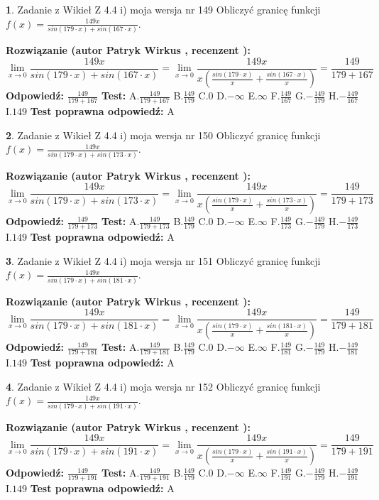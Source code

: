 \documentclass[12pt, a4paper]{article}
\theoremstyle{definition} %
\newtheorem{zad}{}
\newcommand{\zadStart}[1]{\begin{zad}#1\newline}
\newcommand{\zadStop}{\end{zad}}
\newcommand{\rozwStart}[2]{\noindent \textbf{Rozwiązanie (autor #1 , recenzent #2): }\newline}
\newcommand{\rozwStop}{\newline}
\newcommand{\odpStart}{\noindent \textbf{Odpowiedź:}\newline}
\newcommand{\odpStop}{\newline}
\newcommand{\testStart}{\noindent \textbf{Test:}\newline}
\newcommand{\testStop}{\newline}
\newcommand{\kluczStart}{\noindent \textbf{Test poprawna odpowiedź:}\newline}
\newcommand{\kluczStop}{\newline}
\begin{document}
\zadStart{Zadanie z Wikieł Z 4.4 i) moja wersja nr 149}
Obliczyć granicę funkcji $f(x)=\frac{149x}{sin(179\cdot x) +sin(167\cdot x)}$.
\zadStop
\rozwStart{Patryk Wirkus}{}
$$\lim\limits_{x\to 0}\frac{149x}{sin(179\cdot x) +sin(167\cdot x)}=\lim\limits_{x\to 0}\frac{149x}{x(\frac{sin(179\cdot x)}{x}+\frac{sin(167\cdot x)}{x})}=\frac{149}{179+167}$$
\rozwStop
\odpStart
$\frac{149}{179+167}$
\odpStop
\testStart
A.$\frac{149}{179+167}$
B.$\frac{149}{179}$
C.$0$
D.$-\infty$
E.$\infty$
F.$\frac{149}{167}$
G.$-\frac{149}{179}$
H.$-\frac{149}{167}$
I.$149$
\testStop
\kluczStart
A
\kluczStop



\zadStart{Zadanie z Wikieł Z 4.4 i) moja wersja nr 150}
Obliczyć granicę funkcji $f(x)=\frac{149x}{sin(179\cdot x) +sin(173\cdot x)}$.
\zadStop
\rozwStart{Patryk Wirkus}{}
$$\lim\limits_{x\to 0}\frac{149x}{sin(179\cdot x) +sin(173\cdot x)}=\lim\limits_{x\to 0}\frac{149x}{x(\frac{sin(179\cdot x)}{x}+\frac{sin(173\cdot x)}{x})}=\frac{149}{179+173}$$
\rozwStop
\odpStart
$\frac{149}{179+173}$
\odpStop
\testStart
A.$\frac{149}{179+173}$
B.$\frac{149}{179}$
C.$0$
D.$-\infty$
E.$\infty$
F.$\frac{149}{173}$
G.$-\frac{149}{179}$
H.$-\frac{149}{173}$
I.$149$
\testStop
\kluczStart
A
\kluczStop



\zadStart{Zadanie z Wikieł Z 4.4 i) moja wersja nr 151}
Obliczyć granicę funkcji $f(x)=\frac{149x}{sin(179\cdot x) +sin(181\cdot x)}$.
\zadStop
\rozwStart{Patryk Wirkus}{}
$$\lim\limits_{x\to 0}\frac{149x}{sin(179\cdot x) +sin(181\cdot x)}=\lim\limits_{x\to 0}\frac{149x}{x(\frac{sin(179\cdot x)}{x}+\frac{sin(181\cdot x)}{x})}=\frac{149}{179+181}$$
\rozwStop
\odpStart
$\frac{149}{179+181}$
\odpStop
\testStart
A.$\frac{149}{179+181}$
B.$\frac{149}{179}$
C.$0$
D.$-\infty$
E.$\infty$
F.$\frac{149}{181}$
G.$-\frac{149}{179}$
H.$-\frac{149}{181}$
I.$149$
\testStop
\kluczStart
A
\kluczStop



\zadStart{Zadanie z Wikieł Z 4.4 i) moja wersja nr 152}
Obliczyć granicę funkcji $f(x)=\frac{149x}{sin(179\cdot x) +sin(191\cdot x)}$.
\zadStop
\rozwStart{Patryk Wirkus}{}
$$\lim\limits_{x\to 0}\frac{149x}{sin(179\cdot x) +sin(191\cdot x)}=\lim\limits_{x\to 0}\frac{149x}{x(\frac{sin(179\cdot x)}{x}+\frac{sin(191\cdot x)}{x})}=\frac{149}{179+191}$$
\rozwStop
\odpStart
$\frac{149}{179+191}$
\odpStop
\testStart
A.$\frac{149}{179+191}$
B.$\frac{149}{179}$
C.$0$
D.$-\infty$
E.$\infty$
F.$\frac{149}{191}$
G.$-\frac{149}{179}$
H.$-\frac{149}{191}$
I.$149$
\testStop
\kluczStart
A
\kluczStop
\end{document}
